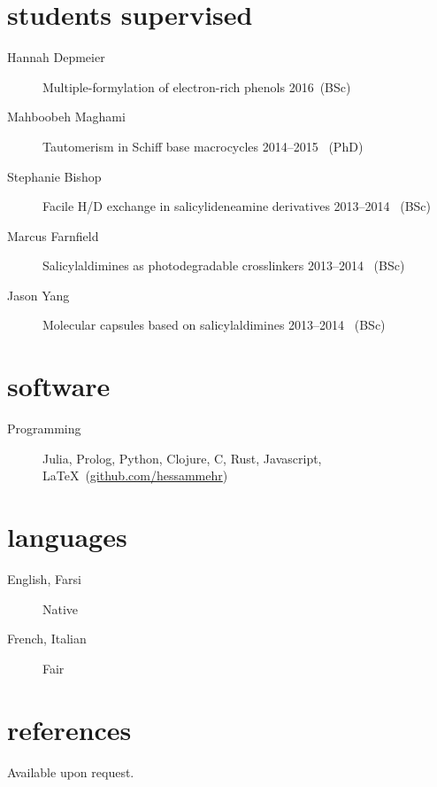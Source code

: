 \documentclass[overlapped,line,10pt,letterpaper]{res}
\begin{document}
\begin{resume}
\section{students supervised}
\begin{description}
\item[Hannah Depmeier] Multiple-formylation of electron-rich phenols \hspace{\fill} 2016\, (BSc)
\item[Mahboobeh Maghami] Tautomerism in Schiff base macrocycles \hspace{\fill} 2014–2015 \, (PhD)
\item[Stephanie Bishop] Facile H/D exchange in salicylideneamine derivatives \hspace{\fill} 2013–2014 \, (BSc)
\item[Marcus Farnfield]  Salicylaldimines as photodegradable crosslinkers \hspace{\fill} 2013–2014 \, (BSc)
\item[Jason Yang]  Molecular capsules based on salicylaldimines \hspace{\fill} 2013–2014 \, (BSc)
\end{description}

\section{software}
\begin{description}
\item[Programming] Julia, Prolog, Python, Clojure, C, Rust, Javascript, \LaTeX \ (\href{https://github.com/hessammehr}{github.com/hessammehr})
\end{description}

\section{languages}
\begin{description}
\item[English, Farsi] Native
\item[French, Italian] Fair
\end{description}

\section{references}
Available upon request.
\end{resume}
\end{document}
